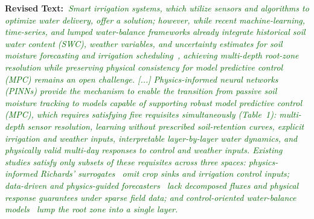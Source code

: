 \documentclass[10pt]{article}
\newcommand{\Rtext}[1]{\textbf{Revised Text:~}#1}
\begin{document}
\Rtext{\emph{\textcolor{darkgreen}{Smart irrigation systems, which utilize sensors and algorithms to optimize water delivery, offer a solution; however, while recent machine-learning, time-series, and lumped water-balance frameworks already integrate historical soil water content (SWC), weather variables, and uncertainty estimates for soil moisture forecasting and irrigation scheduling~\cite{Zou2010, Murcia2024, Bagheri2025, condeforecast2024}, achieving multi-depth root-zone resolution while preserving physical consistency for model predictive control (MPC) remains an open challenge. [...] Physics-informed neural networks (PINNs) provide the mechanism to enable the transition from passive soil moisture tracking to models capable of supporting robust model predictive control (MPC), which requires satisfying five requisites simultaneously (Table~1): multi-depth sensor resolution, learning without prescribed soil-retention curves, explicit irrigation and weather inputs, interpretable layer-by-layer water dynamics, and physically valid multi-day responses to control and weather inputs. Existing studies satisfy only subsets of these requisites across three spaces: physics-informed Richards' surrogates~\cite{Bandai2022, Lan2024, Elkha2024, Bandai2024, Ye2025} omit crop sinks and irrigation control inputs; data-driven and physics-guided forecasters~\cite{Zou2010, Murcia2024, Bagheri2025, WangY2023, ZhangT2025, Jiang2025, Jiang2026} lack decomposed fluxes and physical response guarantees under sparse field data; and control-oriented water-balance models~\cite{condeforecast2024} lump the root zone into a single layer.}}}
\end{document}
